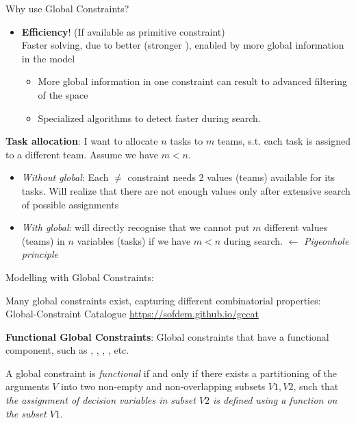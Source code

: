 \documentclass{cons-beamer}
\begin{document}
\begin{frame}{Why use Global Constraints?}
  \begin{itemize}
    \item[+] \textbf{Efficiency}! (If available as primitive constraint) \\
             Faster solving, due to better  (stronger
             ), enabled by more global information in
             the model
             \begin{itemize}
               \item More global information in one constraint can result to advanced filtering of the  space
               \item Specialized algorithms to detect  faster during search.
             \end{itemize}
  \end{itemize}
  \vfill

  \begin{example}
    \textbf{Task allocation}: I want to allocate $n$ tasks to $m$ teams, s.t. each task is assigned to a different team. Assume we have $m < n$. \\
    \begin{itemize}
      \item \textit{Without global}: Each $\neq$ constraint needs 2 values (teams) available for its tasks. Will realize that there are not enough values only after extensive search of possible assignments \\
      \item \textit{With global}:  will directly recognise that we cannot put $m$ different values (teams) in $n$ variables (tasks) if we have $m < n$ during search. $\leftarrow$ \textit{Pigeonhole principle}
    \end{itemize}
  \end{example}
\end{frame}

\begin{frame}{Modelling with Global Constraints:}
  \vfill
  
  Many global constraints exist, capturing different combinatorial properties: \\
  Global-Constraint Catalogue \url{https://sofdem.github.io/gccat}
  \vfill

  \textbf{Functional Global Constraints}: Global constraints that have a functional component, such as , , , , etc.
  \vfill

  \begin{definition}
    A global constraint  is \textit{functional} if and only if there exists a partitioning of the arguments $V$ into two non-empty and non-overlapping subsets $V1, V2$, such that \textit{the assignment of decision variables in subset $V2$ is defined using a function on the subset $V1$}.
  \end{definition}
\end{frame}
\end{document}
